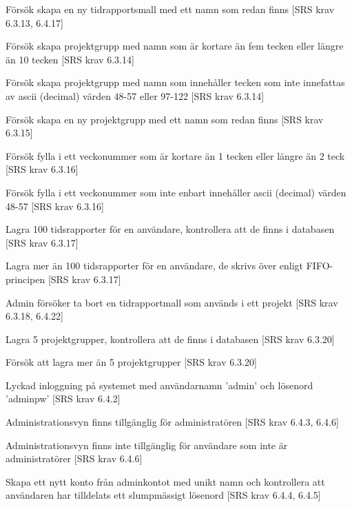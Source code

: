 \documentclass[a4paper]{article}
\begin{document}
\begin{appendices}
\begin{FT}
\item
Försök skapa en ny tidrapportsmall med ett namn som redan finns [SRS krav 6.3.13, 6.4.17]

\item
Försök skapa projektgrupp med namn som är kortare än fem tecken eller längre än 10 tecken [SRS krav 6.3.14]

\item
Försök skapa projektgrupp med namn som innehåller tecken som inte innefattas av ascii (decimal) värden 48-57 eller 97-122 [SRS krav 6.3.14]

\item
Försök skapa en ny projektgrupp med ett namn som redan finns [SRS krav 6.3.15]

\item
Försök fylla i ett veckonummer som är kortare än 1 tecken eller längre än 2 teck [SRS krav 6.3.16]

\item
Försök fylla i ett veckonummer som inte enbart innehåller ascii (decimal) värden 48-57 [SRS krav 6.3.16]

\item
Lagra 100 tidsrapporter för en användare, kontrollera att de finns i databasen [SRS krav 6.3.17]

\item
Lagra mer än 100 tidsrapporter för en användare, de skrivs över enligt FIFO-principen [SRS krav 6.3.17]

\item
Admin försöker ta bort en tidrapportmall som används i ett projekt [SRS krav 6.3.18, 6.4.22]

\item
Lagra 5 projektgrupper, kontrollera att de finns i databasen [SRS krav 6.3.20]

\item
Försök att lagra mer än 5 projektgrupper [SRS krav 6.3.20]

\item
Lyckad inloggning på systemet med användarnamn 'admin' och lösenord 'adminpw' [SRS krav 6.4.2]

\item 
Administrationsvyn finns tillgänglig för administratören [SRS krav 6.4.3, 6.4.6]

\item
Administrationsvyn finns inte tillgänglig för användare som inte är administratörer [SRS krav 6.4.6]

\item
Skapa ett nytt konto från adminkontot med unikt namn och kontrollera att användaren har tilldelats ett slumpmässigt lösenord [SRS krav 6.4.4, 6.4.5]


\end{FT}
\end{appendices}
\end{document}
